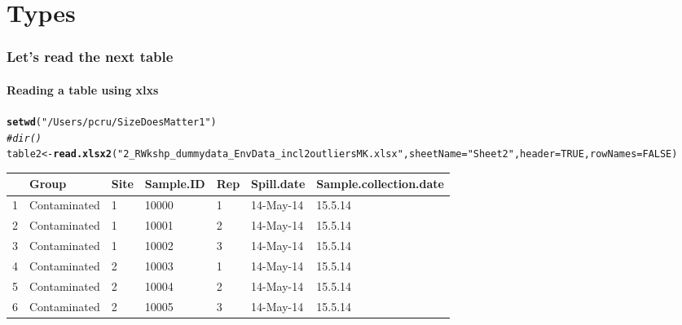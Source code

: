 \documentclass[12pt]{beamer}\usepackage[]{graphicx}\usepackage[]{color}
\makeatletter
\newcommand{\hlnum}[1]{\textcolor[rgb]{0.686,0.059,0.569}{#1}}%
\newcommand{\hlstr}[1]{\textcolor[rgb]{0.192,0.494,0.8}{#1}}%
\newcommand{\hlcom}[1]{\textcolor[rgb]{0.678,0.584,0.686}{\textit{#1}}}%
\newcommand{\hlstd}[1]{\textcolor[rgb]{0.345,0.345,0.345}{#1}}%
\newcommand{\hlkwb}[1]{\textcolor[rgb]{0.69,0.353,0.396}{#1}}%
\newcommand{\hlkwc}[1]{\textcolor[rgb]{0.333,0.667,0.333}{#1}}%
\newcommand{\hlkwd}[1]{\textcolor[rgb]{0.737,0.353,0.396}{\textbf{#1}}}%
\newenvironment{kframe}{%
 \def\at@end@of@kframe{}%
 \ifinner\ifhmode%
  \def\at@end@of@kframe{\end{minipage}}%
  \begin{minipage}{\columnwidth}%
 \fi\fi%
 \def\FrameCommand##1{\hskip\@totalleftmargin \hskip-\fboxsep
 \colorbox{shadecolor}{##1}\hskip-\fboxsep
     \hskip-\linewidth \hskip-\@totalleftmargin \hskip\columnwidth}%
 \MakeFramed {\advance\hsize-\width
   \@totalleftmargin\z@ \linewidth\hsize
   \@setminipage}}%
 {\par\unskip\endMakeFramed%
 \at@end@of@kframe}
\newenvironment{knitrout}{}{} %
\makeatother
\begin{document}
\section*{Types}
\begin{frame}[fragile]
  \frametitle{Let's read the next table}
  \framesubtitle{Reading a table using xlxs}
\begin{knitrout}
\color{fgcolor}\begin{kframe}
\begin{alltt}
\hlkwd{setwd}\hlstd{(}\hlstr{"/Users/pcru/SizeDoesMatter1"}\hlstd{)}
\hlcom{#dir()}
\hlstd{table2}\hlkwb{<-}\hlkwd{read.xlsx2}\hlstd{(}\hlstr{"2_R Wkshp_dummy data_Env Data_incl2outliersMK.xlsx"}\hlstd{,} \hlkwc{sheetName} \hlstd{=}\hlstr{"Sheet2"}\hlstd{,}\hlkwc{header}\hlstd{=}\hlnum{TRUE}\hlstd{,}\hlkwc{rowNames}\hlstd{=}\hlnum{FALSE}\hlstd{)}
\end{alltt}
\end{kframe}
\end{knitrout}
\begin{table}[ht]
\centering
\begin{tabular}{rllllll}
  \hline
 & Group & Site & Sample.ID & Rep & Spill.date & Sample.collection.date \\ 
  \hline
1 & Contaminated & 1 & 10000 & 1 & 14-May-14 & 15.5.14 \\ 
  2 & Contaminated & 1 & 10001 & 2 & 14-May-14 & 15.5.14 \\ 
  3 & Contaminated & 1 & 10002 & 3 & 14-May-14 & 15.5.14 \\ 
  4 & Contaminated & 2 & 10003 & 1 & 14-May-14 & 15.5.14 \\ 
  5 & Contaminated & 2 & 10004 & 2 & 14-May-14 & 15.5.14 \\ 
  6 & Contaminated & 2 & 10005 & 3 & 14-May-14 & 15.5.14 \\ 
   \hline
\end{tabular}
\end{table}

\clearpage
\end{frame}
\end{document}
